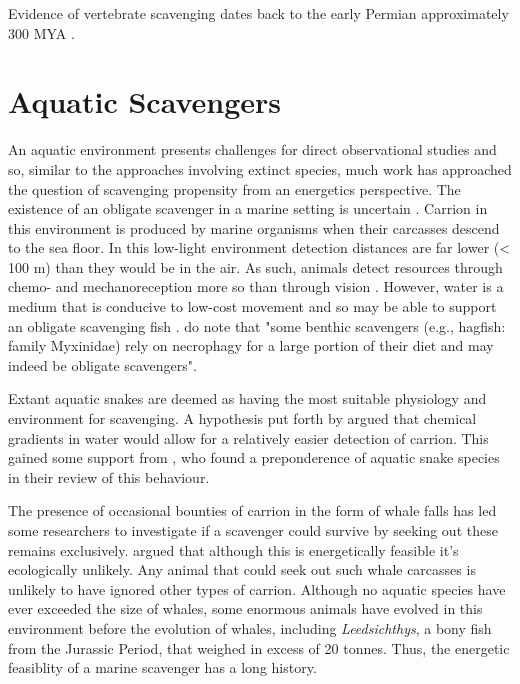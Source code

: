 \documentclass[a4paper,12pt]{article}
\begin{document}
Evidence of vertebrate scavenging dates back to the early Permian approximately 300 MYA \citep{reisz2006articulated}.

\section*{Aquatic Scavengers} 
An aquatic environment presents challenges for direct observational studies and so, similar to the approaches involving extinct species, much work has approached the question of scavenging propensity from an energetics perspective. The existence of an obligate scavenger in a marine setting is uncertain \citep{britton1994marine,smith2003ecology,ruxton2004energetic,ruxton2005searching}. Carrion in this environment is produced by marine organisms when their carcasses descend to the sea floor. In this low-light environment detection distances are far lower (< 100 m) than they would be in the air. As such, animals detect resources through chemo- and mechanoreception more so than through vision \citep{ruxton2004energetic}. However, water is a medium that is conducive to low-cost movement \citep{tucker1975energetic} and so may be able to support an obligate scavenging fish \citep{ruxton2004energetic,ruxton2005searching}. \cite{benbow2015introduction} do note that "some benthic scavengers (e.g., hagfish: family Myxinidae) rely on necrophagy for a large portion of their diet and may indeed be obligate scavengers". 

Extant aquatic snakes are deemed as having the most suitable physiology and environment for scavenging. A hypothesis put forth by \citep{sazima1990necrofagia} argued that chemical gradients in water would allow for a relatively easier detection of carrion. This gained some support from \cite{devault2002scavenging}, who found a preponderence of aquatic snake species in their review of this behaviour. 

The presence of occasional bounties of carrion in the form of whale falls has led some researchers to investigate if a scavenger could survive by seeking out these remains exclusively. \cite{ruxton2005searching} argued that although this is energetically feasible it's ecologically unlikely. Any animal that could seek out such whale carcasses is unlikely to have ignored other types of carrion. Although no aquatic species have ever exceeded the size of whales, some enormous animals have evolved in this environment before the evolution of whales, including \textit{Leedsichthys}, a bony fish from the Jurassic Period, that weighed in excess of 20 tonnes. Thus, the energetic feasiblity of a marine scavenger has a long history.
\end{document}
